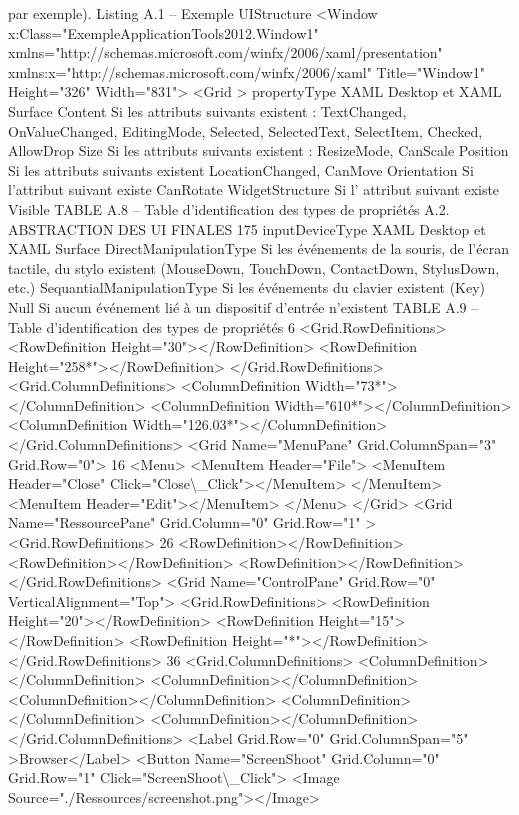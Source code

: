 \documentclass{article}
\begin{document}
par exemple).
Listing A.1 – Exemple UIStructure
<Window x:Class="ExempleApplicationTools2012.Window1"
xmlns="http://schemas.microsoft.com/winfx/2006/xaml/presentation"
xmlns:x="http://schemas.microsoft.com/winfx/2006/xaml"
Title="Window1" Height="326" Width="831">
<Grid >
propertyType
XAML Desktop et XAML Surface
Content
Si les attributs suivants existent : TextChanged, OnValueChanged,
EditingMode, Selected, SelectedText, SelectItem, Checked, AllowDrop
Size
Si les attributs suivants existent : ResizeMode, CanScale
Position
Si les attributs suivants existent LocationChanged, CanMove
Orientation
Si l’attribut suivant existe CanRotate
WidgetStructure
Si l’ attribut suivant existe Visible
TABLE A.8 – Table d’identiﬁcation des types de propri\'{e}t\'{e}s
A.2. ABSTRACTION DES UI FINALES
175
inputDeviceType
XAML Desktop et XAML Surface
DirectManipulationType
Si les \'{e}v\'{e}nements de la souris, de l’\'{e}cran tactile, du stylo
existent (MouseDown, TouchDown, ContactDown, StylusDown,
etc.)
SequantialManipulationType
Si les \'{e}v\'{e}nements du clavier existent (Key)
Null
Si aucun \'{e}v\'{e}nement li\'{e} \`{a} un dispositif d’entr\'{e}e n’existent
TABLE A.9 – Table d’identiﬁcation des types de propri\'{e}t\'{e}s
6
<Grid.RowDeﬁnitions>
<RowDeﬁnition Height="30"></RowDeﬁnition>
<RowDeﬁnition Height="258*"></RowDeﬁnition>
</Grid.RowDeﬁnitions>
<Grid.ColumnDeﬁnitions>
<ColumnDeﬁnition Width="73*"></ColumnDeﬁnition>
<ColumnDeﬁnition Width="610*"></ColumnDeﬁnition>
<ColumnDeﬁnition Width="126.03*"></ColumnDeﬁnition>
</Grid.ColumnDeﬁnitions>
<Grid Name="MenuPane" Grid.ColumnSpan="3" Grid.Row="0">
16
<Menu>
<MenuItem Header="File">
<MenuItem Header="Close" Click="Close\textbackslash{}_Click"></MenuItem>
</MenuItem>
<MenuItem Header="Edit"></MenuItem>
</Menu>
</Grid>
<Grid Name="RessourcePane" Grid.Column="0" Grid.Row="1" >
<Grid.RowDeﬁnitions>
26
<RowDeﬁnition></RowDeﬁnition>
<RowDeﬁnition></RowDeﬁnition>
<RowDeﬁnition></RowDeﬁnition>
</Grid.RowDeﬁnitions>
<Grid Name="ControlPane" Grid.Row="0" VerticalAlignment="Top">
<Grid.RowDeﬁnitions>
<RowDeﬁnition Height="20"></RowDeﬁnition>
<RowDeﬁnition Height="15"></RowDeﬁnition>
<RowDeﬁnition Height="*"></RowDeﬁnition>
</Grid.RowDeﬁnitions>
36
<Grid.ColumnDeﬁnitions>
<ColumnDeﬁnition></ColumnDeﬁnition>
<ColumnDeﬁnition></ColumnDeﬁnition>
<ColumnDeﬁnition></ColumnDeﬁnition>
<ColumnDeﬁnition></ColumnDeﬁnition>
<ColumnDeﬁnition></ColumnDeﬁnition>
</Grid.ColumnDeﬁnitions>
<Label Grid.Row="0" Grid.ColumnSpan="5" >Browser</Label>
<Button Name="ScreenShoot" Grid.Column="0" Grid.Row="1" Click="ScreenShoot\textbackslash{}_Click">
<Image Source="./Ressources/screenshot.png"></Image>
\end{document}
